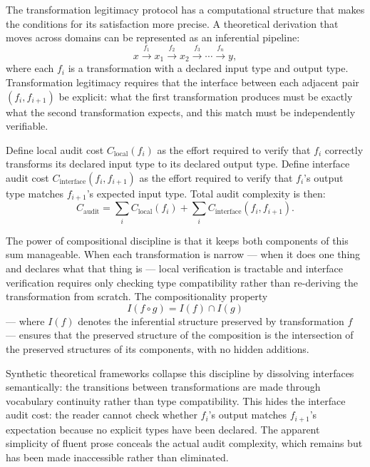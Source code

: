 \documentclass[12pt, openright, twoside]{book}
\begin{document}
\begin{technicalnote}[title={Technical Note: Inferential Pipelines and Audit Locality}]

The transformation legitimacy protocol has a computational structure that makes the
conditions for its satisfaction more precise. A theoretical derivation that moves
across domains can be represented as an inferential pipeline:
\[
x \xrightarrow{f_1} x_1 \xrightarrow{f_2} x_2 \xrightarrow{f_3} \cdots
   \xrightarrow{f_n} y,
\]
where each $f_i$ is a transformation with a declared input type and output type.
Transformation legitimacy requires that the interface between each adjacent pair
$(f_i, f_{i+1})$ be explicit: what the first transformation produces must be exactly
what the second transformation expects, and this match must be independently verifiable.

Define local audit cost $C_{\mathrm{local}}(f_i)$ as the effort required to verify
that $f_i$ correctly transforms its declared input type to its declared output type.
Define interface audit cost $C_{\mathrm{interface}}(f_i, f_{i+1})$ as the effort
required to verify that $f_i$'s output type matches $f_{i+1}$'s expected input type.
Total audit complexity is then:
\[
C_{\mathrm{audit}} = \sum_i C_{\mathrm{local}}(f_i) + \sum_i C_{\mathrm{interface}}(f_i, f_{i+1}).
\]

The power of compositional discipline is that it keeps both components of this sum
manageable. When each transformation is narrow --- when it does one thing and declares
what that thing is --- local verification is tractable and interface verification
requires only checking type compatibility rather than re-deriving the transformation
from scratch. The compositionality property
\[
I(f \circ g) = I(f) \cap I(g)
\]
--- where $I(f)$ denotes the inferential structure preserved by transformation $f$
--- ensures that the preserved structure of the composition is the intersection of
the preserved structures of its components, with no hidden additions.

Synthetic theoretical frameworks collapse this discipline by dissolving interfaces
semantically: the transitions between transformations are made through vocabulary
continuity rather than type compatibility. This hides the interface audit cost:
the reader cannot check whether $f_i$'s output matches $f_{i+1}$'s expectation
because no explicit types have been declared. The apparent simplicity of fluent
prose conceals the actual audit complexity, which remains but has been made
inaccessible rather than eliminated.

\end{technicalnote}
\end{document}

